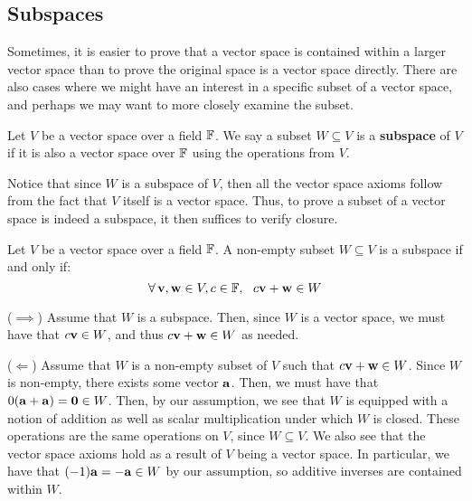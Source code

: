 \documentclass{article}
\begin{document}
\subsection{Subspaces}

Sometimes, it is easier to prove that a vector space is contained within a larger vector space than to prove the original space is a vector space directly.
There are also cases where we might have an interest in a specific subset of a vector space, and perhaps we may want to more closely examine the subset.

\begin{defn}
Let $ V $ be a vector space over a field $ \mathbb{F} $. We say a subset $ W \subseteq V $ is a \textbf{subspace} of $ V $ if it is also a vector space over $ \mathbb{F} $ using the operations from $ V $.
\end{defn}

Notice that since $ W $ is a subspace of $ V $, then all the vector space axioms follow from the fact that $ V $ itself is a vector space.
Thus, to prove a subset of a vector space is indeed a subspace, it then suffices to verify closure.

\begin{thm}
Let $ V $ be a vector space over a field $ \mathbb{F} $. A non-empty subset $ W \subseteq V $ is a subspace if and only if:
\begin{equation*}
\forall \, \mathbf{v, w} \in V, c \in \mathbb{F}, \ \ c\mathbf{v + w} \in W
\end{equation*}
\end{thm}

\begin{pf}[source=Primary Source Material]
    ($ \implies $) Assume that $ W $ is a subspace. Then, since $ W $ is a vector space, we must have that $ c\mathbf{v} \in W $, and thus $ c\mathbf{v + w} \in W $ as needed. \npgh

    ($ \Longleftarrow $) Assume that $ W $ is a non-empty subset of $ V $ such that $ c\mathbf{v + w} \in W $. Since $ W $ is non-empty, there exists some vector $ \mathbf{a} $.
    Then, we must have that $ 0(\mathbf{a + a}) = \mathbf{0} \in W $. Then, by our assumption, we see that $ W $ is equipped with a notion of addition as well as scalar multiplication under which $ W $ is closed.
    These operations are the same operations on $ V $, since $ W \subseteq V $. \vsp
    We also see that the vector space axioms hold as a result of $ V $ being a vector space. In particular, we have that $ (-1)\mathbf{a} = \mathbf{-a} \in W $ by our assumption, so additive inverses are contained within $ W $.
\end{pf}
\end{document}
